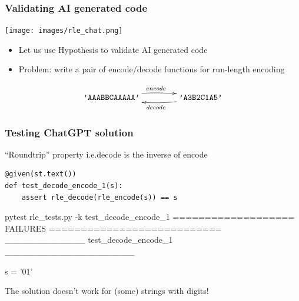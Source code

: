 \documentclass{beamer}
\begin{document}
\begin{frame}[allowframebreaks]
  \frametitle{Validating AI generated code}

    \begin{center}
\texttt{[image: images/rle\_chat.png]}
  \end{center}
  
  \begin{itemize}
  \item Let us use Hypothesis to validate AI generated code
  \item Problem: write a pair of encode/decode functions
    for \alert{run-length encoding}   
  \end{itemize}

  \[ \xymatrix@-0.5pc {
      \texttt{'AAABBCAAAAA'}\ar@/^/[rr]^{encode} &
      & \texttt{'A3B2C1A5'}\ar@/^/[ll]^{decode}
    }
  \]

\end{frame}

\begin{frame}[fragile]
  \frametitle{Testing ChatGPT solution}

  \begin{block}{``Roundtrip'' property i.e.\@ decode is the inverse of encode}
\begin{verbatim}
@given(st.text())
def test_decode_encode_1(s):
    assert rle_decode(rle_encode(s)) == s
\end{verbatim}
    \end{block}\pause


\begin{semiverbatim}
pytest rle_tests.py -k test_decode_encode_1
=================== FAILURES ===========================
\alert{_____________ test_decode_encode_1 _____________________}

s = '01'
\end{semiverbatim}

The solution doesn't work for (some) strings with digits!
  
\end{frame}
\end{document}
